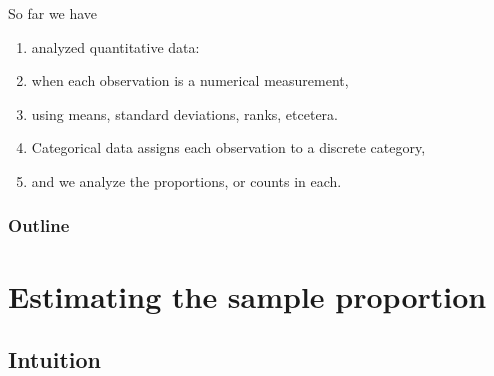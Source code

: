 %
%
%



\subtitle{with confidence}

\date{2 November 2015}




\begin{frame}
  \maketitle
\end{frame}


\begin{frame}{So far we have}
  \begin{enumerate}
    \item analyzed \alert{quantitative} data:
    \item when each observation is a numerical measurement,
    \item using means, standard deviations, ranks, etcetera.
    \item \alert{Categorical data} assigns each observation to a discrete category,
    \item and we analyze the proportions, or counts in each.
  \end{enumerate}
\end{frame}

\begin{frame}\frametitle<presentation>{Outline}
  \tableofcontents
\end{frame}



\section{Estimating the sample proportion}
\subsection{Intuition}

